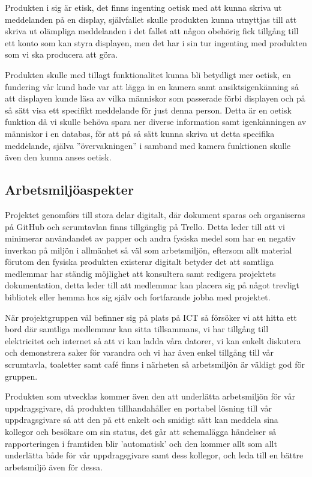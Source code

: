 \documentclass[11pt]{article}
\begin{document}
Produkten i sig är etisk, det finns ingenting oetisk med att kunna
skriva ut meddelanden på en display, självfallet skulle produkten
kunna utnyttjas till att skriva ut olämpliga meddelanden i det fallet
att någon obehörig fick tillgång till ett konto som kan styra
displayen, men det har i sin tur ingenting med produkten som vi ska
producera att göra.

Produkten skulle med tillagt funktionalitet kunna bli betydligt mer
oetisk, en fundering vår kund hade var att lägga in en kamera samt
ansiktsigenkänning så att displayen kunde läsa av vilka människor som
passerade förbi displayen och på så sätt visa ett specifikt
meddelande för just denna person. Detta är en oetisk funktion då vi
skulle behöva spara ner diverse information samt igenkänningen av
människor i en databas, för att på så sätt kunna skriva ut detta
specifika meddelande, själva ”övervakningen” i samband med kamera
funktionen skulle även den kunna anses oetisk.

\subsection{Arbetsmiljöaspekter}
\label{sec:orgd3ee5dc}
Projektet genomförs till stora delar digitalt, där dokument sparas
och organiseras på GitHub och scrumtavlan finns tillgänglig på
Trello. Detta leder till att vi minimerar användandet av papper och
andra fysiska medel som har en negativ inverkan på miljön i allmänhet
så väl som arbetsmiljön, eftersom allt material förutom den fysiska
produkten existerar digitalt betyder det att samtliga medlemmar har
ständig möjlighet att konsultera samt redigera projektets
dokumentation, detta leder till att medlemmar kan placera sig på
något trevligt bibliotek eller hemma hos sig själv och fortfarande
jobba med projektet.

När projektgruppen väl befinner sig på plats på ICT så försöker vi
att hitta ett bord där samtliga medlemmar kan sitta tillsammans, vi
har tillgång till elektricitet och internet så att vi kan ladda våra
datorer, vi kan enkelt diskutera och demonstrera saker för varandra
och vi har även enkel tillgång till vår scrumtavla, toaletter samt
café finns i närheten så arbetsmiljön är väldigt god för gruppen.

Produkten som utvecklas kommer även den att underlätta arbetsmiljön
för vår uppdragsgivare, då produkten tillhandahåller en portabel
lösning till vår uppdragsgivare så att den på ett enkelt och smidigt
sätt kan meddela sina kollegor och besökare om sin status, det går
att schemalägga händelser så rapporteringen i framtiden blir
'automatisk' och den kommer allt som allt underlätta både för vår
uppdragsgivare samt dess kollegor, och leda till en bättre
arbetsmiljö även för dessa.
\end{document}
